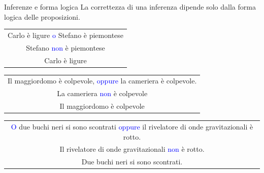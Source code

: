 \documentclass[aspectratio=169,10pt]{beamer}
\newcommand{\conn}[1]{\textcolor{blue}{#1}}
\newenvironment{inference}{\begin{tabular}{c}}{\end{tabular}}
\begin{document}
\begin{frame}{Inferenze e forma logica}
	La correttezza di una inferenza dipende solo dalla \alert{forma logica} delle proposizioni.
	\begin{example}
		\begin{center}
		\begin{inference}
			Carlo è ligure \conn{o} Stefano è piemontese\\
			Stefano \conn{non} è piemontese\\
			\hline
			Carlo è ligure
		\end{inference}
		\end{center}
        \medskip

        \begin{center}
		\begin{inference}
			Il maggiordomo è colpevole, \conn{oppure} la cameriera è colpevole.\\
			La cameriera \conn{non} è colpevole\\
			\hline
			Il maggiordomo è colpevole
		\end{inference}
        \end{center}
        \medskip

        \begin{center}
            \begin{inference}
		\conn{O} due buchi neri si sono scontrati \conn{oppure} il rivelatore di onde gravitazionali è rotto.\\
		Il rivelatore di onde gravitazionali \conn{non} è rotto.\\
        \hline
         Due buchi neri si sono scontrati.
       \end{inference}
       \end{center}
	\end{example}
\end{frame}
\end{document}
